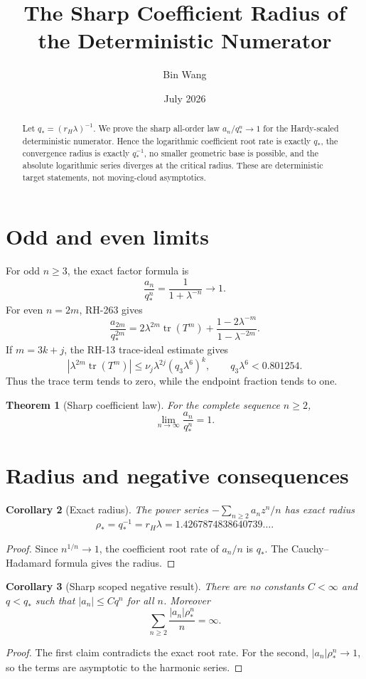 \documentclass[11pt]{article}
\title{The Sharp Coefficient Radius of the Deterministic Numerator}\author{Bin Wang}\date{July 2026}
\newtheorem{theorem}{Theorem}[section]\newtheorem{corollary}[theorem]{Corollary}\theoremstyle{remark}\newtheorem{remark}[theorem]{Remark}
\begin{document}
\maketitle
\begin{abstract}
Let $q_*=(r_H\lambda)^{-1}$.  We prove the sharp all-order law
$a_n/q_*^n\to1$ for the Hardy-scaled deterministic numerator.  Hence the
logarithmic coefficient root rate is exactly $q_*$, the convergence radius is
exactly $q_*^{-1}$, no smaller geometric base is possible, and the absolute
logarithmic series diverges at the critical radius.  These are deterministic
target statements, not moving-cloud asymptotics.
\end{abstract}

\section{Odd and even limits}
For odd $n\ge3$, the exact factor formula is \citep{WangRH15,WangRH267}
\[
 \frac{a_n}{q_*^n}=\frac1{1+\lambda^{-n}}\longrightarrow1.
\]
For even $n=2m$, RH-263 gives
\[
 \frac{a_{2m}}{q_*^{2m}}
 =2\lambda^{2m}\operatorname{tr}(T^m)
 +\frac{1-2\lambda^{-m}}{1-\lambda^{-2m}}.
\]
If $m=3k+j$, the RH-13 trace-ideal estimate \citep{WangRH13} gives
\[
 |\lambda^{2m}\operatorname{tr}(T^m)|
 \le \nu_j\lambda^{2j}(q_3\lambda^6)^k,
 \qquad q_3\lambda^6<0.801254.
\]
Thus the trace term tends to zero, while the endpoint fraction tends to one.

\begin{theorem}[Sharp coefficient law]
For the complete sequence $n\ge2$,
\[
 \boxed{\displaystyle\lim_{n\to\infty}\frac{a_n}{q_*^n}=1.}
\]
\end{theorem}

\section{Radius and negative consequences}
\begin{corollary}[Exact radius]
The power series $-\sum_{n\ge2}a_nz^n/n$ has exact radius
\[
 \rho_*=q_*^{-1}=r_H\lambda=1.4267874838640739\ldots .
\]
\end{corollary}
\begin{proof}
Since $n^{1/n}\to1$, the coefficient root rate of $a_n/n$ is $q_*$.
The Cauchy--Hadamard formula gives the radius.
\end{proof}

\begin{corollary}[Sharp scoped negative result]
There are no constants $C<\infty$ and $q<q_*$ such that
$|a_n|\le Cq^n$ for all $n$.  Moreover
\[
 \sum_{n\ge2}\frac{|a_n|\rho_*^n}{n}=\infty.
\]
\end{corollary}
\begin{proof}
The first claim contradicts the exact root rate.  For the second,
$|a_n|\rho_*^n\to1$, so the terms are asymptotic to the harmonic series.
\end{proof}
\end{document}
